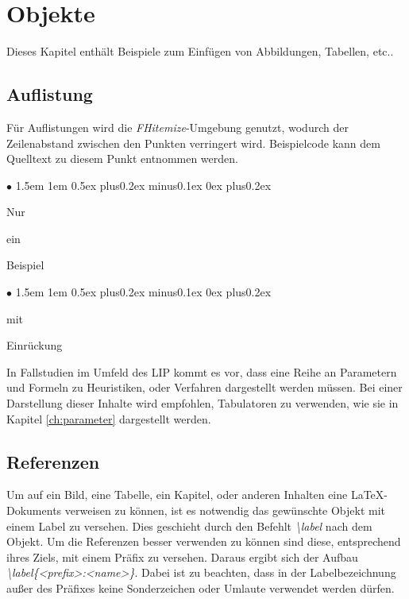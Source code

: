 \documentclass[13pt,a4paper, listof=entryprefix, bibliography=totocnumbered,toc=listofnumbered,lof=listofnumbered]{scrartcl}
\newenvironment{FHitemize}{\begin{list}{$\bullet$} {\leftmargin1.5em \labelsep1em \rightmargin0cm \parsep0.5ex plus0.2ex minus0.1ex \itemsep0ex plus0.2ex}}{\end{list}}
\begin{document}



\pagebreak
\section{Objekte}
\label{ch:objekte}
Dieses Kapitel enthält Beispiele zum Einfügen von Abbildungen, Tabellen, etc..

\subsection{Auflistung}

Für Auflistungen wird die \textit{FHitemize}-Umgebung genutzt, wodurch der Zeilenabstand zwischen den Punkten verringert wird. Beispielcode kann dem Quelltext zu diesem Punkt entnommen werden.

\begin{FHitemize}
	\item Nur
	\item ein
	\item Beispiel
	\begin{FHitemize}
		\item mit
		\item Einrückung
	\end{FHitemize}
\end{FHitemize}

In Fallstudien im Umfeld des \gls{LIP} kommt es vor, dass eine Reihe an Parametern und Formeln zu Heuristiken, oder Verfahren dargestellt werden müssen. Bei einer Darstellung dieser Inhalte wird empfohlen, Tabulatoren zu verwenden, wie sie in Kapitel \ref{ch:parameter} dargestellt werden.

\subsection{Referenzen}
\label{ch:referenz}
Um auf ein Bild, eine Tabelle, ein Kapitel, oder anderen Inhalten eine \LaTeX-Dokuments verweisen zu können, ist es notwendig das gewünschte Objekt mit einem Label zu versehen. Dies geschieht durch den Befehlt \textit{\textbackslash label} nach dem Objekt. Um die Referenzen besser verwenden zu können sind diese, entsprechend ihres Ziels, mit einem Präfix zu versehen. Daraus ergibt sich der Aufbau \textit{\textbackslash label\{\textless prefix\textgreater:\textless name\textgreater\}}. Dabei ist zu beachten, dass in der Labelbezeichnung außer des Präfixes keine Sonderzeichen oder Umlaute verwendet werden dürfen.
\end{document}
